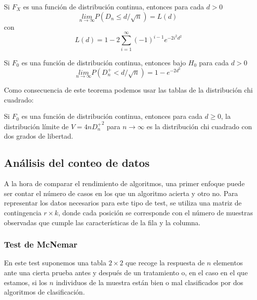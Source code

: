 \begin{teorema}
	Si $F_X$ es una función de distribución continua, 
entonces para cada $d>0$
	\[ \underset{n \rightarrow \infty}{lim}
			P(D_n \leq d/\sqrt{n}) = L(d) \]
	con
	\[ L(d) = 1 - 2 \sum\limits_{i=1}^\infty 
			(-1)^{i-1} e^{-2i^2d^2}	\]
\end{teorema}

\begin{teorema}
	Si $F_0$ es una función de distribución continua, 
entonces bajo $H_0$ para cada $d>0$
	\[ \underset{n \rightarrow \infty}{lim}
			P(D_n^+ < d/\sqrt{n}) = 1-e^{-2d^2} \]
\end{teorema}	
	Como consecuencia de este teorema podemos usar las tablas
de la distribución chi cuadrado:
	
\begin{corolario}
	Si $F_0$ es una función de distribución continua, 
entonces para cada $d \geq 0$, la distribución límite de 
$V = 4n {D_n^+}^2$ para $n \rightarrow \infty$ es la 
distribución chi cuadrado con dos grados de libertad.
\end{corolario}	
	
\subsection{Análisis del conteo de datos}
	
	A la hora de comparar el rendimiento de algoritmos, una 
primer enfoque puede ser contar el número de casos en los que 
un algoritmo acierta y otro no. Para representar los datos 
necesarios para este tipo de test, se utiliza una matriz de 
contingencia $r \times k$, donde cada posición se corresponde 
con el número de muestras observadas que cumple las 
características de la fila y la columna.
	
\subsubsection{Test de McNemar}
	
	En este test suponemos una tabla $2 \times 2$ que recoge 
la respuesta de $n$ elementos ante una cierta prueba antes y 
después de un tratamiento o, en el caso en el que estamos, si 
los $n$ individuos de la muestra están bien o mal 
clasificados por dos algoritmos de clasificación.
	
